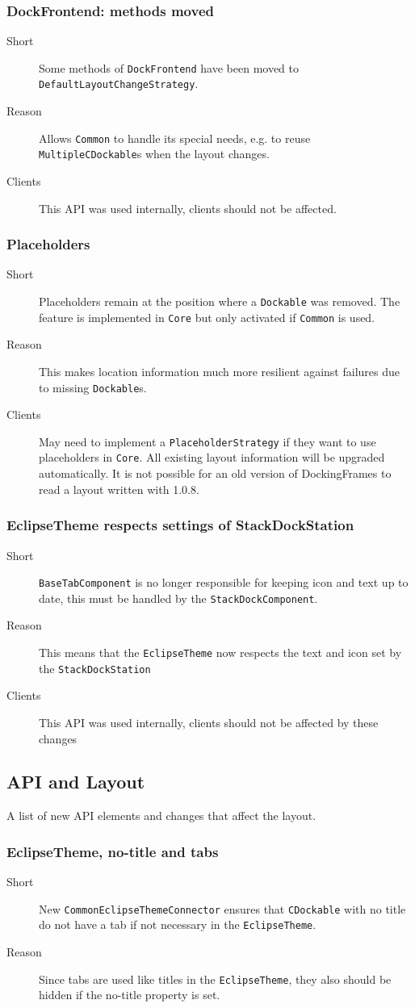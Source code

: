 \documentclass[a4paper,10pt]{article}
\newcommand{\src}[1]{\lstinline[basicstyle=\normalsize\ttfamily,keywordstyle=\normalsize\ttfamily,identifierstyle=\normalsize\ttfamily]|#1|}
\newcommand{\short}{\item[Short]}
\newcommand{\why}{\item[Reason]}
\newcommand{\clients}{\item[Clients]}
\begin{document}
\subsubsection{DockFrontend: methods moved}
\begin{description}
 \short Some methods of \src{DockFrontend} have been moved to \src{DefaultLayoutChangeStrategy}.
 \why Allows \src{Common} to handle its special needs, e.g. to reuse \src{MultipleCDockable}s when the layout changes.
 \clients This API was used internally, clients should not be affected.
\end{description}

\subsubsection{Placeholders}
\begin{description}
 \short Placeholders remain at the position where a \src{Dockable} was removed. The feature is implemented in \src{Core} but only activated if \src{Common} is used.
 \why This makes location information much more resilient against failures due to missing \src{Dockable}s.
 \clients May need to implement a \src{PlaceholderStrategy} if they want to use placeholders in \src{Core}. All existing layout information will be upgraded automatically. It is not possible for an old version of DockingFrames to read a layout written with 1.0.8.
\end{description}

\subsubsection{EclipseTheme respects settings of StackDockStation}
\begin{description}
 \short \src{BaseTabComponent} is no longer responsible for keeping icon and text up to date, this must be handled by the \src{StackDockComponent}. 
 \why This means that the \src{EclipseTheme} now respects the text and icon set by the \src{StackDockStation}
 \clients This API was used internally, clients should not be affected by these changes
\end{description}



\subsection{API and Layout}
A list of new API elements and changes that affect the layout.
\subsubsection{EclipseTheme, no-title and tabs}
\begin{description}
 \short New \src{CommonEclipseThemeConnector} ensures that \src{CDockable} with no title do not have a tab if not necessary in the \src{EclipseTheme}.
 \why Since tabs are used like titles in the \src{EclipseTheme}, they also should be hidden if the no-title property is set.
\end{description}
\end{document}
